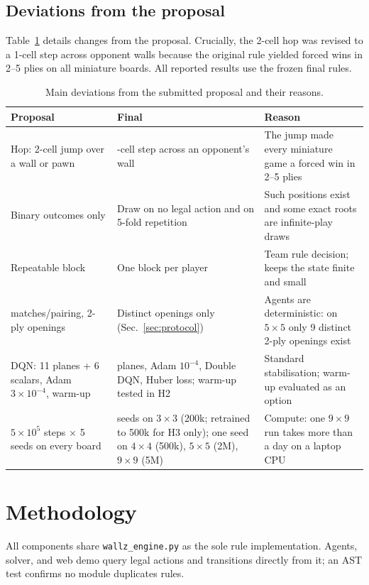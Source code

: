 \documentclass[10pt]{article}
\begin{document}
\subsection{Deviations from the proposal}
Table~\ref{tab:dev} details changes from the proposal. Crucially, the 2-cell hop was revised to a 1-cell step across opponent walls because the original rule yielded forced wins in 2--5 plies on all miniature boards. All reported results use the frozen final rules.

\begin{table}[!tb]
\centering\small
\caption{Main deviations from the submitted proposal and their reasons.}
\label{tab:dev}
\begin{tabular}{>{\raggedright\arraybackslash}p{4.2cm}>{\raggedright\arraybackslash}p{4.6cm}>{\raggedright\arraybackslash}p{6.3cm}}
\toprule
Proposal & Final & Reason\\
\midrule
Hop: 2-cell jump over a wall or pawn & 1-cell step across an opponent's wall & The jump made every miniature game a forced win in 2--5 plies\\
Binary outcomes only & Draw on no legal action and on 5-fold repetition & Such positions exist and some exact roots are infinite-play draws\\
Repeatable block & One block per player & Team rule decision; keeps the state finite and small\\
500 matches/pairing, 2-ply openings & Distinct openings only (Sec.~\ref{sec:protocol}) & Agents are deterministic: on $5\times5$ only 9 distinct 2-ply openings exist\\
DQN: 11 planes + 6 scalars, Adam $3\!\times\!10^{-4}$, warm-up & 14 planes, Adam $10^{-4}$, Double DQN, Huber loss; warm-up tested in H2 & Standard stabilisation; warm-up evaluated as an option\\
$5\times10^5$ steps $\times$ 5 seeds on every board & 5 seeds on $3\times3$ (200k; retrained to 500k for H3 only); one seed on $4\times4$ (500k), $5\times5$ (2M), $9\times9$ (5M) & Compute: one $9\times9$ run takes more than a day on a laptop CPU\\
\bottomrule
\end{tabular}
\end{table}

\section{Methodology}\label{sec:method}
All components share \texttt{wallz\_engine.py} as the sole rule implementation. Agents, solver, and web demo query legal actions and transitions directly from it; an AST test confirms no module duplicates rules.
\end{document}
